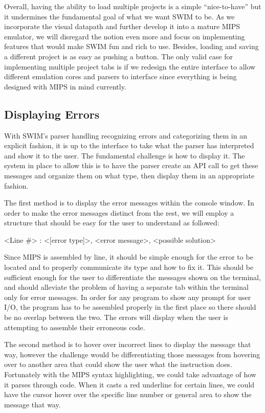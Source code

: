 \documentclass[
    paper=letter,
    parskip=half,
    fontsize=12pt,
    titlepage=firstiscover,
    toc=bibliography,
    numbers=endperiod
]{scrartcl}
\begin{document}
Overall, having the ability to load multiple projects is a simple
``nice-to-have'' but it undermines the fundamental goal of what we want
SWIM to be. As we incorporate the visual datapath and further develop it
into a mature MIPS emulator, we will disregard the notion even more and
focus on implementing features that would make SWIM fun and rich to use.
Besides, loading and saving a different project is as easy as pushing a
button. The only valid case for implementing multiple project tabs is if
we redesign the entire interface to allow different emulation cores and
parsers to interface since everything is being designed with MIPS in
mind currently.

\subsection{Displaying Errors}

With SWIM's parser handling recognizing errors and categorizing them in
an explicit fashion, it is up to the interface to take what the parser
has interpreted and show it to the user. The fundamental challenge is
how to display it. The system in place to allow this is to have the
parser create an API call to get these messages and organize them on
what type, then display them in an appropriate fashion.

The first method is to display the error messages within the console
window. In order to make the error messages distinct from the rest, we
will employ a structure that should be easy for the user to understand
as followed:

\begin{center}
    \textless Line \#\textgreater{} : \textless{[}error type{]}\textgreater,
    \textless error message\textgreater, \textless possible
    solution\textgreater{}
\end{center}

Since MIPS is assembled by line, it should be simple enough for the
error to be located and to properly communicate its type and how to fix
it. This should be sufficient enough for the user to differentiate the
messages shown on the terminal, and should alleviate the problem of
having a separate tab within the terminal only for error messages. In
order for any program to show any prompt for user I/O, the program has
to be assembled properly in the first place so there should be no
overlap between the two. The errors will display when the user is
attempting to assemble their erroneous code.

The second method is to hover over incorrect lines to display the
message that way, however the challenge would be differentiating those
messages from hovering over to another area that could show the user
what the instruction does. Fortunately with the MIPS syntax
highlighting, we could take advantage of how it parses through code.
When it casts a red underline for certain lines, we could have the
cursor hover over the specific line number or general area to show the
message that way.
\end{document}
